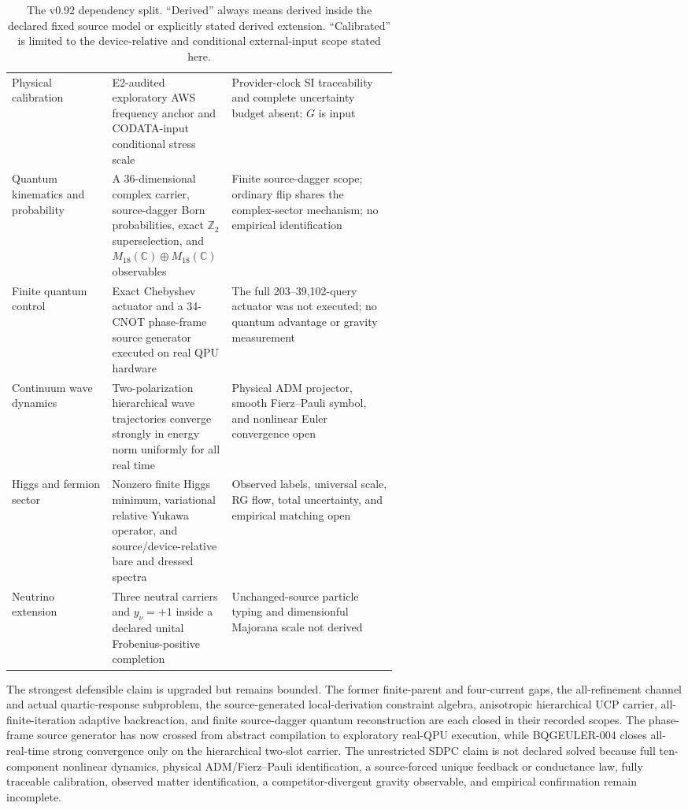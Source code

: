 \documentclass[11pt]{article}
\theoremstyle{definition}
\theoremstyle{remark}
\begin{document}
\begin{table}[ht]
\begin{tabularx}{\linewidth}{>{\raggedright\arraybackslash}p{0.26\linewidth} >{\raggedright\arraybackslash}p{0.31\linewidth} X}
Physical calibration & E2-audited exploratory AWS frequency anchor and CODATA-input conditional stress scale & Provider-clock SI traceability and complete uncertainty budget absent; $G$ is input \\
Quantum kinematics and probability & A 36-dimensional complex carrier, source-dagger Born probabilities, exact $\mathbb Z_2$ superselection, and $M_{18}(\mathbb C)\oplus M_{18}(\mathbb C)$ observables & Finite source-dagger scope; ordinary flip shares the complex-sector mechanism; no empirical identification \\
Finite quantum control & Exact Chebyshev actuator and a 34-CNOT phase-frame source generator executed on real QPU hardware & The full 203--39,102-query actuator was not executed; no quantum advantage or gravity measurement \\
Continuum wave dynamics & Two-polarization hierarchical wave trajectories converge strongly in energy norm uniformly for all real time & Physical ADM projector, smooth Fierz--Pauli symbol, and nonlinear Euler convergence open \\
Higgs and fermion sector & Nonzero finite Higgs minimum, variational relative Yukawa operator, and source/device-relative bare and dressed spectra & Observed labels, universal scale, RG flow, total uncertainty, and empirical matching open \\
Neutrino extension & Three neutral carriers and $y_\nu=+1$ inside a declared unital Frobenius-positive completion & Unchanged-source particle typing and dimensionful Majorana scale not derived \\
\bottomrule
\end{tabularx}
\caption{The v0.92 dependency split. ``Derived'' always means derived inside the declared fixed source model or explicitly stated derived extension. ``Calibrated'' is limited to the device-relative and conditional external-input scope stated here.}
\label{tab:delta}
\end{table}

The strongest defensible claim is upgraded but remains bounded. The former finite-parent and four-current gaps, the all-refinement channel and actual quartic-response subproblem, the source-generated local-derivation constraint algebra, anisotropic hierarchical UCP carrier, all-finite-iteration adaptive backreaction, and finite source-dagger quantum reconstruction are each closed in their recorded scopes. The phase-frame source generator has now crossed from abstract compilation to exploratory real-QPU execution, while BQGEULER-004 closes all-real-time strong convergence only on the hierarchical two-slot carrier. The unrestricted SDPC claim is not declared solved because full ten-component nonlinear dynamics, physical ADM/Fierz--Pauli identification, a source-forced unique feedback or conductance law, fully traceable calibration, observed matter identification, a competitor-divergent gravity observable, and empirical confirmation remain incomplete.
\end{document}
